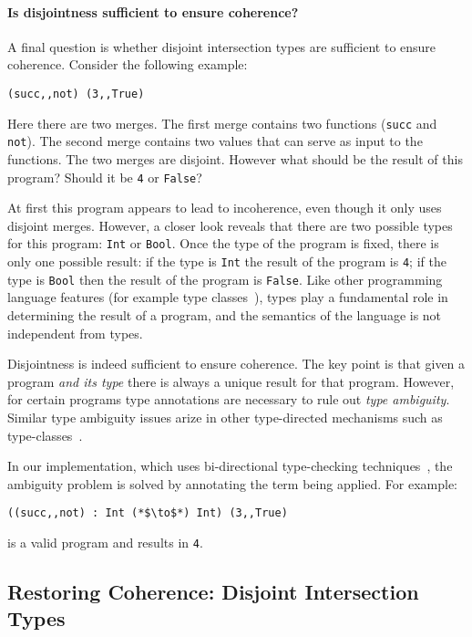 \paragraph {Is disjointness sufficient to ensure coherence?} A final question
is whether disjoint intersection types are sufficient to ensure coherence. 
Consider the following example:

\begin{lstlisting}
(succ,,not) (3,,True)
\end{lstlisting}

\noindent Here there are two merges. The first merge contains two functions 
(\lstinline$succ$ and \lstinline$not$). The second merge contains two values 
that can serve as input to the functions. The two merges are disjoint. 
However what should be the result of this program? Should it be 
\lstinline$4$ or \lstinline$False$? 

At first this program appears to lead to incoherence, even though it only uses
disjoint merges. However, a closer look reveals that there are two possible 
types for this program: \lstinline{Int} or \lstinline{Bool}. Once the type 
of the program is fixed, there is only one possible result: if the type is 
\lstinline$Int$ the result of the program is \lstinline$4$; if the type 
is \lstinline$Bool$ then the result of the program is \lstinline$False$. 
Like other programming language features (for example type classes~\cite{}), 
types play a fundamental role in determining the result of a program, and the 
semantics of the language is not independent from types. 

Disjointness is indeed sufficient to ensure coherence. The key point is that 
given a program \emph{and its type} there is always a unique result for that 
program. However, for certain programs type annotations are necessary to rule 
out \emph{type ambiguity}. Similar type ambiguity issues arize in other type-directed 
mechanisms such as type-classes~\cite{}. 

In our implementation, which uses bi-directional type-checking techniques~\cite{}, 
the ambiguity problem is solved by annotating the term being applied. For example:

\begin{lstlisting}
((succ,,not) : Int (*$\to$*) Int) (3,,True)
\end{lstlisting}

\noindent is a valid program and results in \lstinline$4$.

\subsection{Restoring Coherence: Disjoint Intersection Types}\label{sec:restoring}

